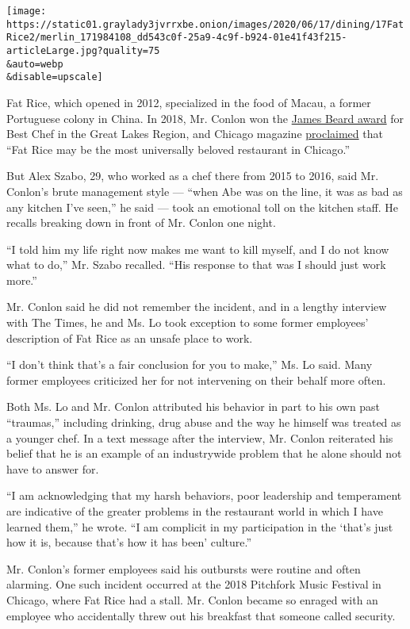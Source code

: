 \texttt{[image: https://static01.graylady3jvrrxbe.onion/images/2020/06/17/dining/17FatRice2/merlin\_171984108\_dd543c0f-25a9-4c9f-b924-01e41f43f215-articleLarge.jpg?quality=75\\\&auto=webp\\\&disable=upscale]}

Fat Rice, which opened in 2012, specialized in the food of Macau, a
former Portuguese colony in China. In 2018, Mr. Conlon won the
\href{https://www.jamesbeard.org/chef/abraham-conlon}{James Beard award}
for Best Chef in the Great Lakes Region, and Chicago magazine
\href{https://www.chicagomag.com/dining-drinking/July-2018/The-50-Best-Restaurants-in-Chicago/Fat-Rice/}{proclaimed}
that ``Fat Rice may be the most universally beloved restaurant in
Chicago.''

But Alex Szabo, 29, who worked as a chef there from 2015 to 2016, said
Mr. Conlon's brute management style --- ``when Abe was on the line, it
was as bad as any kitchen I've seen,'' he said --- took an emotional
toll on the kitchen staff. He recalls breaking down in front of Mr.
Conlon one night.

``I told him my life right now makes me want to kill myself, and I do
not know what to do,'' Mr. Szabo recalled. ``His response to that was I
should just work more.''

Mr. Conlon said he did not remember the incident, and in a lengthy
interview with The Times, he and Ms. Lo took exception to some former
employees' description of Fat Rice as an unsafe place to work.

``I don't think that's a fair conclusion for you to make,'' Ms. Lo said.
Many former employees criticized her for not intervening on their behalf
more often.

Both Ms. Lo and Mr. Conlon attributed his behavior in part to his own
past ``traumas,'' including drinking, drug abuse and the way he himself
was treated as a younger chef. In a text message after the interview,
Mr. Conlon reiterated his belief that he is an example of an
industrywide problem that he alone should not have to answer for.

``I am acknowledging that my harsh behaviors, poor leadership and
temperament are indicative of the greater problems in the restaurant
world in which I have learned them,'' he wrote. ``I am complicit in my
participation in the `that's just how it is, because that's how it has
been' culture.''

Mr. Conlon's former employees said his outbursts were routine and often
alarming. One such incident occurred at the 2018 Pitchfork Music
Festival in Chicago, where Fat Rice had a stall. Mr. Conlon became so
enraged with an employee who accidentally threw out his breakfast that
someone called security.

